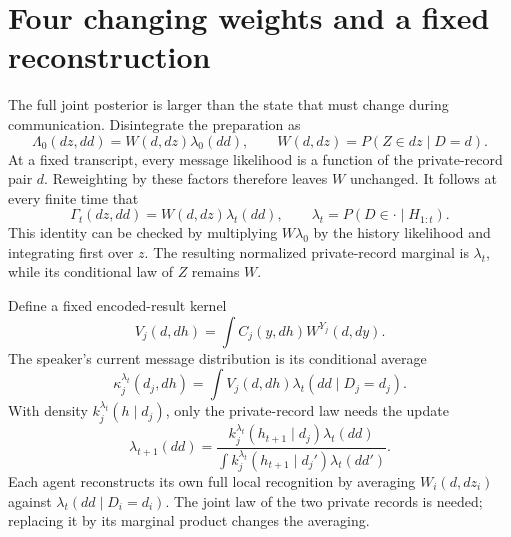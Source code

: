 \section{Four changing weights and a fixed reconstruction}
\label{comp:interaction-retention}

The full joint posterior is larger than the state that must change during communication. Disintegrate the preparation as
\begin{equation}
\Lambda_0(dz,dd)=W(d,dz)\lambda_0(dd),\qquad
W(d,dz)=P(Z\in dz\mid D=d).
\end{equation}
At a fixed transcript, every message likelihood is a function of the private-record pair $d$. Reweighting by these factors therefore leaves $W$ unchanged. It follows at every finite time that
\begin{equation}
\Gamma_t(dz,dd)=W(d,dz)\lambda_t(dd),\qquad
\lambda_t=P(D\in\cdot\mid H_{1:t}).
\label{comp:eq-interaction-retention}
\end{equation}
This identity can be checked by multiplying $W\lambda_0$ by the history likelihood and integrating first over $z$. The resulting normalized private-record marginal is $\lambda_t$, while its conditional law of $Z$ remains $W$.

Define a fixed encoded-result kernel
\begin{equation}
V_j(d,dh)=\int C_j(y,dh)W^{Y_j}(d,dy).
\end{equation}
The speaker's current message distribution is its conditional average
\begin{equation}
\kappa_j^{\lambda_t}(d_j,dh)
=\int V_j(d,dh)\lambda_t(dd\mid D_j=d_j).
\end{equation}
With density $k_j^{\lambda_t}(h\mid d_j)$, only the private-record law needs the update
\begin{equation}
\lambda_{t+1}(dd)
=\frac{k_j^{\lambda_t}(h_{t+1}\mid d_j)\lambda_t(dd)}
{\int k_j^{\lambda_t}(h_{t+1}\mid d_j')\lambda_t(dd')}.
\label{comp:eq-interaction-private-update}
\end{equation}
Each agent reconstructs its own full local recognition by averaging $W_i(d,dz_i)$ against $\lambda_t(dd\mid D_i=d_i)$. The joint law of the two private records is needed; replacing it by its marginal product changes the averaging.


